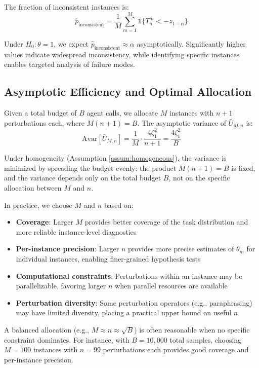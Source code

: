 \documentclass{article}
\theoremstyle{plain}
\theoremstyle{definition}
\theoremstyle{remark}
\begin{document}
The fraction of inconsistent instances is:
\begin{equation}
    \hat{p}_{\text{inconsistent}} = \frac{1}{M}\sum_{m=1}^M \mathbb{1}\{T_n^m < -z_{1-\alpha}\}
\end{equation}

Under $H_0: \theta = 1$, we expect $\hat{p}_{\text{inconsistent}} \approx \alpha$ asymptotically. Significantly higher values indicate widespread inconsistency, while identifying specific instances enables targeted analysis of failure modes.

\subsection{Asymptotic Efficiency and Optimal Allocation}

Given a total budget of $B$ agent calls, we allocate $M$ instances with $n+1$ perturbations each, where $M(n+1) = B$. The asymptotic variance of $\bar{U}_{M,n}$ is:
\begin{equation}
    \text{Avar}[\bar{U}_{M,n}] = \frac{1}{M} \cdot \frac{4\zeta_1^2}{n+1} = \frac{4\zeta_1^2}{B}
\end{equation}

Under homogeneity (Assumption \ref{assum:homogeneous}), the variance is minimized by spreading the budget evenly: the product $M(n+1) = B$ is fixed, and the variance depends only on the total budget $B$, not on the specific allocation between $M$ and $n$. 

In practice, we choose $M$ and $n$ based on:
\begin{itemize}[nolistsep,leftmargin=*]
    \item \textbf{Coverage}: Larger $M$ provides better coverage of the task distribution and more reliable instance-level diagnostics
    \item \textbf{Per-instance precision}: Larger $n$ provides more precise estimates of $\theta_m$ for individual instances, enabling finer-grained hypothesis tests
    \item \textbf{Computational constraints}: Perturbations within an instance may be parallelizable, favoring larger $n$ when parallel resources are available
    \item \textbf{Perturbation diversity}: Some perturbation operators (e.g., paraphrasing) may have limited diversity, placing a practical upper bound on useful $n$
\end{itemize}

A balanced allocation (e.g., $M \approx n \approx \sqrt{B}$) is often reasonable when no specific constraint dominates. For instance, with $B = 10,000$ total samples, choosing $M = 100$ instances with $n = 99$ perturbations each provides good coverage and per-instance precision.
\end{document}
